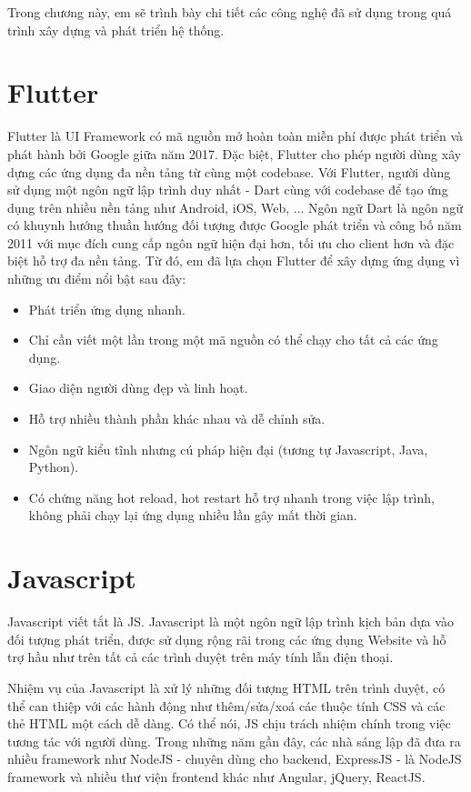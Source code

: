 \documentclass[../DoAn.tex]{subfiles}
\begin{document}
Trong chương này, em sẽ trình bày chi tiết các công nghệ đã sử dụng trong quá trình xây dựng và phát triển hệ thống.

\section{Flutter}
\label{section:3.1}

Flutter là UI Framework có mã nguồn mở hoàn toàn miễn phí được phát triển và phát hành bởi Google giữa năm 2017. Đặc biệt, Flutter cho phép người dùng xây dựng các ứng dụng đa nền tảng từ cùng một codebase. Với Flutter, người dùng sử dụng một ngôn ngữ lập trình duy nhất - Dart cùng với codebase để tạo ứng dụng trên nhiều nền tảng như Android, iOS, Web, ... Ngôn ngữ Dart là ngôn ngữ có khuynh hướng thuần hướng đối tượng được Google phát triển và công bố năm 2011 với mục đích cung cấp ngôn ngữ hiện đại hơn, tối ưu cho client hơn và đặc biệt hỗ trợ đa nền tảng. Từ đó, em đã lựa chọn Flutter để xây dựng ứng dụng vì những ưu điểm nổi bật sau đây:

\begin{itemize}
    \item Phát triển ứng dụng nhanh.
    \item Chỉ cần viết một lần trong một mã nguồn có thể chạy cho tất cả các ứng dụng.
    \item Giao diện người dùng đẹp và linh hoạt.
    \item Hỗ trợ nhiều thành phần khác nhau và dễ chỉnh sửa.
    \item Ngôn ngữ kiểu tĩnh nhưng cú pháp hiện đại (tương tự Javascript, Java, Python).
    \item Có chứng năng hot reload, hot restart hỗ trợ nhanh trong việc lập trình, không phải chạy lại ứng dụng nhiều lần gây mất thời gian.
\end{itemize}

\section{Javascript}
\label{section:3.2}

Javascript viết tắt là JS. Javascript là một ngôn ngữ lập trình kịch bản dựa vào đối tượng phát triển, được sử dụng rộng rãi trong các ứng dụng Website và hỗ trợ hầu như trên tất cả các trình duyệt trên máy tính lẫn điện thoại.

Nhiệm vụ của Javascript là xử lý những đối tượng HTML trên trình duyệt, có thể can thiệp với các hành động như thêm/sửa/xoá các thuộc tính CSS và các thẻ HTML một cách dễ dàng. Có thể nói, JS chịu trách nhiệm chính trong việc tương tác với người dùng. Trong những năm gần đây, các nhà sáng lập đã đưa ra nhiều framework như NodeJS - chuyên dùng cho backend, ExpressJS\cite{ExpressJS} - là NodeJS framework và nhiều thư viện frontend khác như Angular, jQuery, ReactJS.
\end{document}

